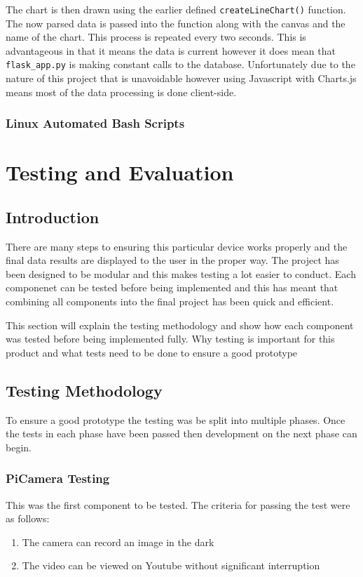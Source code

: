 \documentclass[10pt,a4paper]{article}
\begin{document}
The chart is then drawn using the earlier defined \texttt{createLineChart()} function. The now parsed data is passed into the function along with the canvas and the name of the chart. This process is repeated every two seconds. This is advantageous in that it means the data is current however it does mean that \texttt{flask\_app.py} is making constant calls to the database. Unfortunately due to the nature of this project that is unavoidable however using Javascript with Charts.js means most of the data processing is done client-side. 

\subsubsection{Linux Automated Bash Scripts}

\pagebreak
\section{Testing and Evaluation}
\subsection{Introduction}
There are many steps to ensuring this particular device works properly and the final data results are displayed to the user in the proper way. The project has been designed to be modular and this makes testing a lot easier to conduct. Each componenet can be tested before being implemented and this has meant that combining all components into the final project has been quick and efficient.

This section will explain the testing methodology and show how each component was tested before being implemented fully. 
Why testing is important for this product and what tests need to be done to ensure a good prototype
\subsection{Testing Methodology}
To ensure a good prototype the testing was be split into multiple phases. Once the tests in each phase have been passed then development on the next phase can begin.
\subsubsection{PiCamera Testing}
This was the first component to be tested. The criteria for passing the test were as follows: 
\begin{enumerate}
  \item The camera can record an image in the dark
  \item The video can be viewed on Youtube without significant interruption
\end{enumerate}
\end{document}
